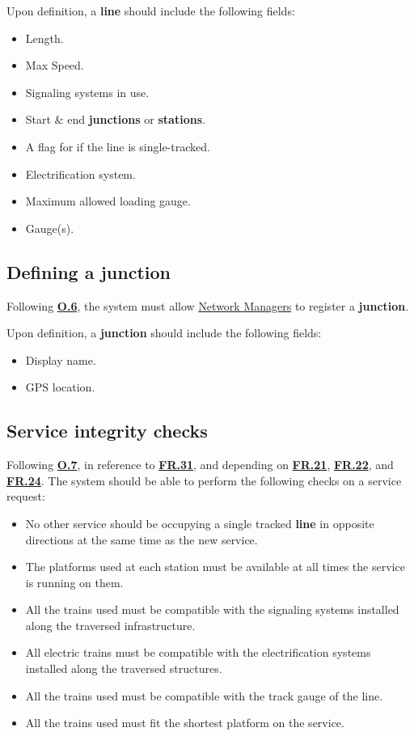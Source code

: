 \documentclass[12pt]{article}
\renewcommand\bf[1]{\textbf{#1}}
\newcommand\un[1]{\underline{#1}}
\newcommand\hyl[1]{\hyperref[#1]{\bf{#1}}}
\begin{document}
Upon definition, a \bf{line} should include the following fields:
\begin{itemize}
	\item Length.
	\item Max Speed.
	\item Signaling systems in use.
	\item Start \& end \bf{junctions} or \bf{stations}.
	\item A flag for if the line is single-tracked.
	\item Electrification system.
	\item Maximum allowed loading gauge.
	\item Gauge(s).
\end{itemize}

\subsection{Defining a junction} \label{FR.28}
Following \hyl{O.6}, the system must allow \un{Network Managers} to register a \bf{junction}.

Upon definition, a \bf{junction} should include the following fields:
\begin{itemize}
	\item Display name.
	\item GPS location.
\end{itemize}

\subsection{Service integrity checks} \label{FR.29}
Following \hyl{O.7}, in reference to \hyl{FR.31}, and depending on \hyl{FR.21}, \hyl{FR.22}, and \hyl{FR.24}.
The system should be able to perform the following checks on a service request:
\begin{itemize}
	\item No other service should be occupying a single tracked \bf{line} in opposite directions at the same time as the new service.
	\item The platforms used at each station must be available at all times the service is running on them.
	\item All the trains used must be compatible with the signaling systems installed along the traversed infrastructure.
	\item All electric trains must be compatible with the electrification systems installed along the traversed structures.
	\item All the trains used must be compatible with the track gauge of the line.
	\item All the trains used must fit the shortest platform on the service.
\end{itemize}
\end{document}

